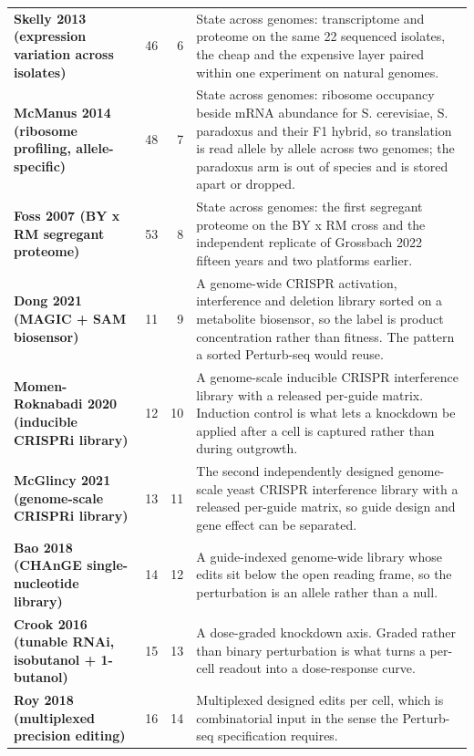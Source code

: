 \begin{longtable}{@{}L{46mm} r@{\hspace{6pt}} r@{\hspace{6pt}} L{104mm}@{}}
\addlinespace[5pt]
\textbf{Skelly 2013 (expression variation across isolates)} & 46 & 6 & State across genomes: transcriptome and proteome on the same 22 sequenced isolates, the cheap and the expensive layer paired within one experiment on natural genomes. \\
\addlinespace[5pt]
\textbf{McManus 2014 (ribosome profiling, allele-specific)} & 48 & 7 & State across genomes: ribosome occupancy beside mRNA abundance for S. cerevisiae, S. paradoxus and their F1 hybrid, so translation is read allele by allele across two genomes; the paradoxus arm is out of species and is stored apart or dropped. \\
\addlinespace[5pt]
\textbf{Foss 2007 (BY x RM segregant proteome)} & 53 & 8 & State across genomes: the first segregant proteome on the BY x RM cross and the independent replicate of Grossbach 2022 fifteen years and two platforms earlier. \\
\addlinespace[5pt]
\textbf{Dong 2021 (MAGIC + SAM biosensor)} & 11 & 9 & A genome-wide CRISPR activation, interference and deletion library sorted on a metabolite biosensor, so the label is product concentration rather than fitness. The pattern a sorted Perturb-seq would reuse. \\
\addlinespace[5pt]
\textbf{Momen-Roknabadi 2020 (inducible CRISPRi library)} & 12 & 10 & A genome-scale inducible CRISPR interference library with a released per-guide matrix. Induction control is what lets a knockdown be applied after a cell is captured rather than during outgrowth. \\
\addlinespace[5pt]
\textbf{McGlincy 2021 (genome-scale CRISPRi library)} & 13 & 11 & The second independently designed genome-scale yeast CRISPR interference library with a released per-guide matrix, so guide design and gene effect can be separated. \\
\addlinespace[5pt]
\textbf{Bao 2018 (CHAnGE single-nucleotide library)} & 14 & 12 & A guide-indexed genome-wide library whose edits sit below the open reading frame, so the perturbation is an allele rather than a null. \\
\addlinespace[5pt]
\textbf{Crook 2016 (tunable RNAi, isobutanol + 1-butanol)} & 15 & 13 & A dose-graded knockdown axis. Graded rather than binary perturbation is what turns a per-cell readout into a dose-response curve. \\
\addlinespace[5pt]
\textbf{Roy 2018 (multiplexed precision editing)} & 16 & 14 & Multiplexed designed edits per cell, which is combinatorial input in the sense the Perturb-seq specification requires. \\

\end{longtable}
